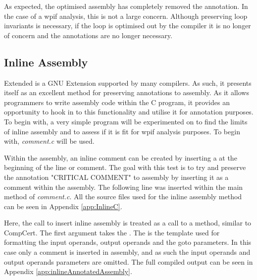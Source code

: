 

As expected, the optimised assembly has completely removed the annotation. In the case of a wpif analysis, this is not a large concern. Although preserving loop invariants is necessary, if the loop is optimised out by the compiler it is no longer of concern and the annotations are no longer necessary.


\subsection{Inline Assembly}
\label{subsec:inlineAssembly}

Extended  is a GNU Extension supported by many compilers. As such, it presents itself as an excellent method for preserving annotations to assembly. As it allows programmers to write assembly code within the C program, it provides an opportunity to hook in to this functionality and utilise it for annotation purposes. To begin with, a very simple program will be experimented on to find the limits of inline assembly and to assess if it is fit for wpif analysis purposes. To begin with, \textit{comment.c} will be used.

Within the assembly, an inline comment can be created by inserting a \code{\#} at the beginning of the line or comment. The goal with this test is to try and preserve the annotation "CRITICAL COMMENT" to assembly by inserting it as a comment within the assembly. The following line was inserted within the main method of \textit{comment.c}. All the source files used for the inline assembly method can be seen in Appendix \ref{app:InlineC}.



Here, the call to insert inline assembly is treated as a call to a method, similar to CompCert. The first argument takes the . The  is the template used for formatting the input operands, output operands and the goto parameters. In this case only a comment is inserted in assembly, and as such the input operands and output operands parameters are omitted. The full compiled output can be seen in Appendix \ref{app:inlineAnnotatedAssembly}.



